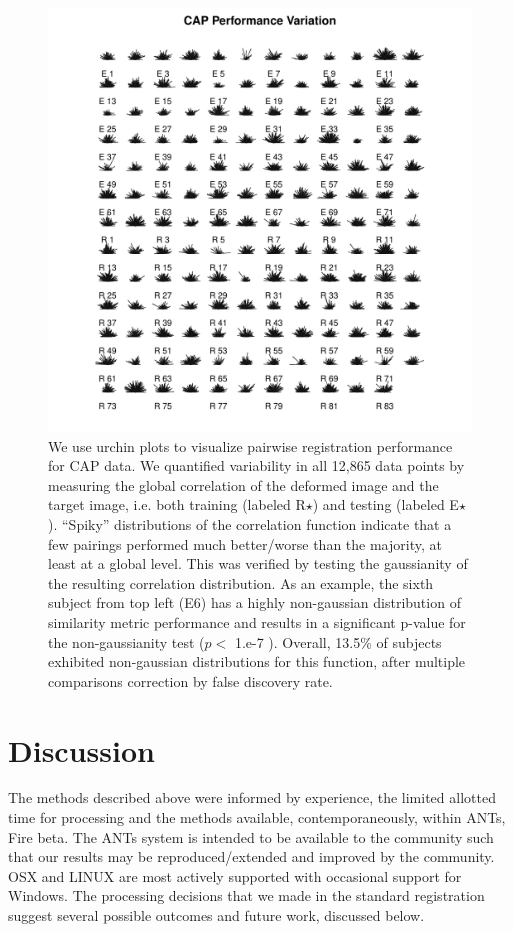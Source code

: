 \documentclass{llncs}
\begin{document}
\begin{figure}[t]
 \centering 
  \includegraphics[width=5in]{../figs/spider_CAP.pdf}
 \caption{We use urchin plots to visualize pairwise registration
   performance for CAP data.  We quantified variability in
   all 12,865 data points by measuring
   the global correlation of the deformed image and the target image,
   i.e. both training (labeled R$\star$) and testing (labeled E$\star$). ``Spiky''
   distributions of the correlation function indicate that
 a few pairings performed much better/worse than the majority, at
 least at a global level.  This
 was verified by testing the gaussianity of the resulting correlation
 distribution.  As an example, the sixth subject from top left (E6) has a
 highly non-gaussian distribution of similarity metric performance and
results in a significant p-value for the non-gaussianity test ($p <$
1.e-7 ).  Overall, 13.5\% of subjects exhibited non-gaussian
distributions for this function, after multiple comparisons correction by false discovery rate.}
 \label{fig:CAPvar}
\end{figure}

\section{Discussion} 
The methods described above were informed by experience, the limited
allotted time for processing and the methods available,
contemporaneously, within ANTs, Fire beta.  The ANTs system is
intended to be available to the community such that our results may be
reproduced/extended and improved by the community.  OSX and LINUX are
most actively supported with occasional support for Windows.  The
processing decisions that we made in the standard registration suggest
several possible outcomes and future work, discussed below.  
\end{document}
